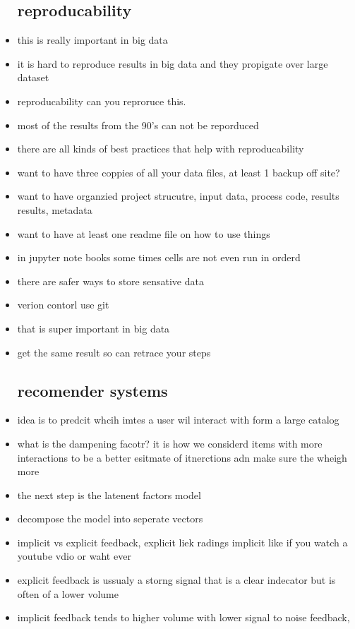 \documentclass{article}
\begin{document}
\begin{itemize}
\subsection*{reproducability}
\item this is really important in big data
\item it is hard to reproduce results in big data and they propigate over large dataset 
\item reproducability can you reproruce this. 
\item most of the results from the 90's can not be reporduced
\item there are all kinds of best practices that help with reproducability
\item want to have three coppies of all your data files, at least 1 backup off site? 
\item want to have organzied project strucutre, input data, process code, results results, metadata 
\item want to have at least one readme file on how to use things
\item in jupyter note books some times cells are not even run in orderd 
\item there are safer ways to store sensative data
\item verion contorl use git 
\item that is super important in big data
\item get the same result so can retrace your steps
\subsection*{recomender systems}
\item idea is to predcit whcih imtes a user wil interact with form a large catalog
\item what is the dampening facotr? it is how we considerd items with more interactions to be a better esitmate of itnerctions adn make sure the wheigh more 
\item the next step is the latenent factors model 
\item decompose the model into seperate vectors
\item implicit vs explicit feedback, explicit liek radings implicit like if you watch a youtube vdio or waht ever 
\item explicit feedback is ussualy a storng signal that is a clear indecator but is often of a lower volume 
\item implicit feedback tends to higher volume with lower signal to noise feedback, 

\end{itemize}
\end{document}

